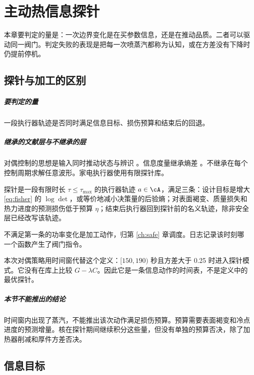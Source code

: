 \chapter{主动热信息探针}
\label{ch:ati}

本章要判定的量是：一次边界变化是在买参数信息，还是在推动品质。二者可以驱动同一阀门。判定失败的表现是把每一次喷蒸汽都称为认知，或在方差没有下降时仍提前停机。

\section{探针与加工的区别}

\paragraph{要判定的量}
一段执行器轨迹是否同时满足信息目标、损伤预算和结束后的回退。

\paragraph{继承的文献层与不继承的层}
对偶控制的思想是输入同时推动状态与辨识 \cite{feldbaum1965}。信息度量继承熵差 \cite{lindley1956}。不继承在每个控制周期求解任意波形。家电执行器使用有限探针库。

\begin{definition}[热信息探针]
探针是一段有限时长 \(\tau\le\tau_{\max}\) 的执行器轨迹 \(a\in\cA\)，满足三条：设计目标是增大 \eqref{eq:fisher} 的 \(\log\det\)，或等价地减小决策量的后验熵；对表面褐变、质量损失和热力进度的预测损伤低于预算 \(\eta\)；结束后执行器回到探针前的名义轨迹，除非安全层已经改写该轨迹。
\end{definition}

不满足第一条的功率变化是加工动作，归第 \ref{ch:safe} 章调度。日志记录该时刻哪一个函数产生了阀门指令。

本次对偶策略用时间窗代替这个定义：\([150,190)\) 秒且方差大于 0.25 时进入探针模式。它没有在库上比较 \(G-\lambda C\)。因此它是一条信息动作的时间表，不是定义中的最优探针。

\paragraph{本节不能推出的结论}
时间窗内出现了蒸汽，不能推出该次动作满足损伤预算。预算需要表面褐变和冷点进度的预测增量。核在探针期间继续积分这些量，但没有单独的预算否决，除了加热器削减和厚件方差否决。

\section{信息目标}

